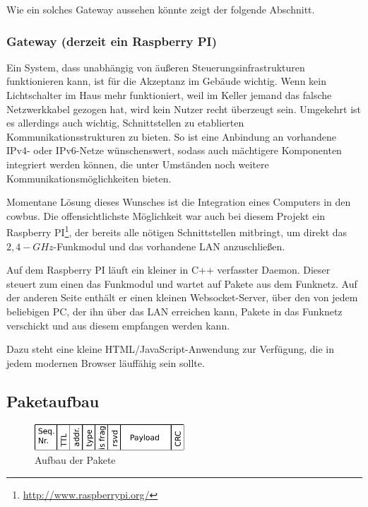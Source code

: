 \documentclass{IEEEtran}
\begin{document}
            Wie ein solches Gateway aussehen könnte zeigt der folgende Abschnitt.

        \subsubsection{Gateway (derzeit ein Raspberry PI)}
            Ein System, dass unabhängig von äußeren Steuerungsinfrastrukturen
            funktionieren kann, ist für die Akzeptanz im Gebäude wichtig.
            Wenn kein Lichtschalter im Haus mehr funktioniert, weil
            im Keller jemand das falsche Netzwerkkabel gezogen hat,
            wird kein Nutzer recht überzeugt sein.
            Umgekehrt ist es allerdings auch wichtig, Schnittstellen zu
            etablierten Kommunikationsstrukturen zu bieten.
            So ist eine Anbindung an vorhandene IPv4- oder IPv6-Netze
            wünschenswert, sodass auch mächtigere Komponenten integriert werden
            können, die unter Umständen noch weitere Kommunikationsmöglichkeiten
            bieten.

            Momentane Lösung dieses Wunsches ist die Integration eines Computers
            in den cowbus. Die offensichtlichste Möglichkeit war auch bei diesem
            Projekt ein Raspberry PI\footnote{\url{http://www.raspberrypi.org/}},
            der bereits alle nötigen Schnittstellen mitbringt, um direkt das
            $2,4-GHz$-Funkmodul und das vorhandene \ac{LAN} anzuschließen.

            Auf dem Raspberry PI läuft ein kleiner in C++ verfasster Daemon.
            Dieser steuert zum einen das Funkmodul und wartet auf Pakete aus
            dem Funknetz.
            Auf der anderen Seite enthält er einen kleinen Websocket-Server,
            über den von jedem beliebigen PC, der ihn über das \ac{LAN}
            erreichen kann, Pakete in das Funknetz verschickt und aus diesem
            empfangen werden kann.

            Dazu steht eine kleine HTML/JavaScript-Anwendung zur Verfügung,
            die in jedem modernen Browser läuffähig sein sollte.


    
    \subsection{Paketaufbau}
            \begin{figure}
            \centering
            \includegraphics[width=0.5\textwidth]{img/paket}
            \caption{Aufbau der Pakete}
            \label{fig:paket}
        \end{figure}
\end{document}

